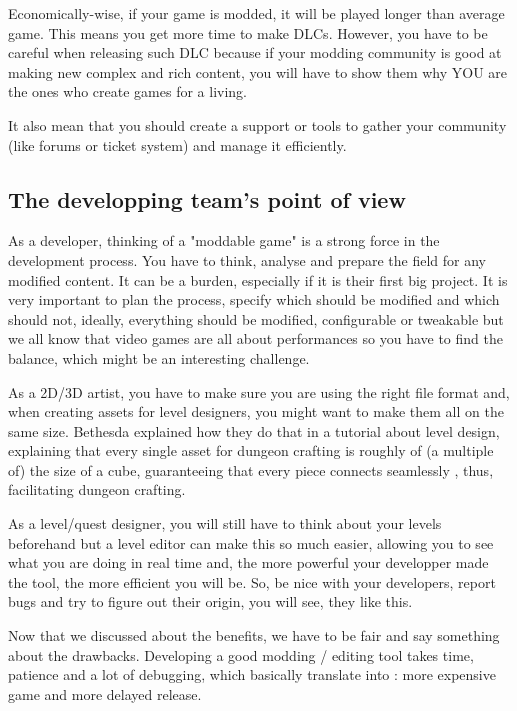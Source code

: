 \documentclass[a4paper,12pt]{article}
\begin{document}
Economically-wise, if your game is modded, it will be played longer than average game. This means you get more time to make DLCs. However, you have to be careful when releasing such DLC because if your modding community is good at making new complex and rich content, you will have to show them why YOU are the ones who create games for a living.

It also mean that you should create a support or tools to gather your community (like forums or ticket system)  and manage it efficiently.


\subsection{The developping team's point of view}

As a developer, thinking of a "moddable game" is a strong force in the development process. You have to think, analyse and prepare the field for any modified content. It can be a burden, especially if it is their first big project. It is very important to plan the process, specify which should be modified and which should not, ideally, everything should be modified, configurable or tweakable but we all know that video games are all about performances so you have to find the balance, which might be an interesting challenge.

As a 2D/3D artist, you have to make sure you are using the right file format and, when creating assets for level designers, you might want to make them all on the same size. Bethesda explained how they do that in a tutorial about level design, explaining that every single asset for dungeon crafting is roughly of (a multiple of) the size of a cube, guaranteeing that every piece connects seamlessly , thus, facilitating dungeon crafting.

As a level/quest designer, you will still have to think about your levels beforehand but a level editor can make this so much easier, allowing you to see what you are doing in real time and, the more powerful your developper made the tool, the more efficient you will be. So, be nice with your developers, report bugs and try to figure out their origin, you will see, they like this.

Now that we discussed about the benefits, we have to be fair and say something about the drawbacks. Developing a good modding / editing tool takes time, patience and a lot of debugging, which basically translate into : more expensive game and more delayed release.
\end{document}
